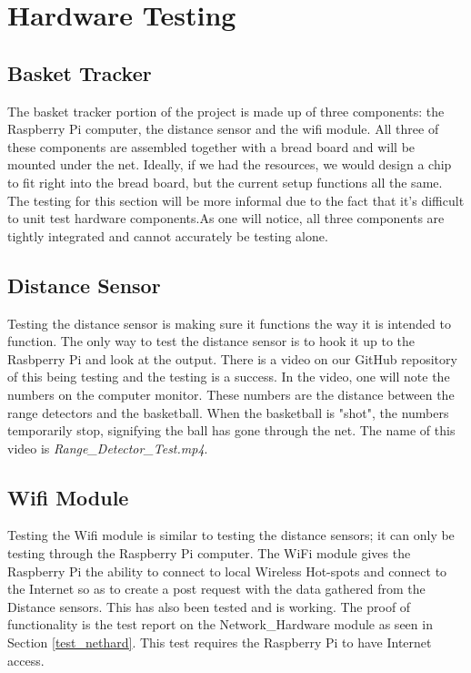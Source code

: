 \chapter{Hardware Testing}

\setlength{\parindent}{0cm}

\section{Basket Tracker}
The basket tracker portion of the project is made up of three components: the Raspberry Pi computer, the distance sensor and the wifi module. All three of these components are assembled together with a bread board and will be mounted under the net. Ideally, if we had the resources, we would design a chip to fit right into the bread board, but the current setup functions all the same.
\\
The testing for this section will be more informal due to the fact that it's difficult to unit test hardware components.As one will notice, all three components are tightly integrated and cannot accurately be testing alone.

\section{Distance Sensor}
Testing the distance sensor is making sure it functions the way it is intended to function. The only way to test the distance sensor is to hook it up to the Rasbperry Pi and look at the output. There is a video on our GitHub repository of this being testing and the testing is a success. In the video, one will note the numbers on the computer monitor. These numbers are the distance between the range detectors and the basketball. When the basketball is "shot", the numbers temporarily stop, signifying the ball has gone through the net. The name of this video is \textit{Range\_Detector\_Test.mp4}.

\section{Wifi Module}
Testing the Wifi module is similar to testing the distance sensors; it can only be testing through the Raspberry Pi computer. The WiFi module gives the Raspberry Pi the ability to connect to local Wireless Hot-spots and connect to the Internet so as to create a post request with the data gathered from the Distance sensors. This has also been tested and is working. The proof of functionality is the test report on the Network\_Hardware module as seen in Section \ref{test_nethard}. This test requires the Raspberry Pi to have Internet access.

